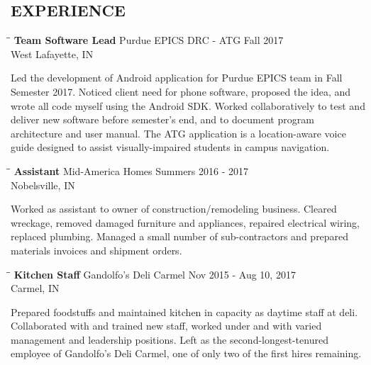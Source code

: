 \documentclass[10pt]{res}
\begin{document}
\begin{resume}
\section{EXPERIENCE}
   \vspace{-0.1in}	
	\begin{tabbing}
   \hspace{2.3in}\= \hspace{2.6in}\= \kill %
    {\bf Team Software Lead} \>Purdue EPICS DRC - ATG \>Fall 2017 \\
                             \>West Lafayette, IN
   \end{tabbing}\vspace{-20pt}      %
	Led the development of Android application for Purdue EPICS team in Fall Semester 2017. Noticed client need for phone software, proposed the idea, and wrote all code myself
	using the Android SDK. Worked collaboratively to test and deliver new software before semester's end, and to document program architecture and user manual. The ATG
	application is a location-aware voice guide designed to assist visually-impaired students in campus navigation.
	\begin{tabbing}
   \hspace{2.3in}\= \hspace{2.6in}\= \kill %
    {\bf Assistant} \>Mid-America Homes \>Summers 2016 - 2017 \\
                             \>Nobelsville, IN
   \end{tabbing}\vspace{-20pt}      %
	Worked as assistant to owner of construction/remodeling business. 
	Cleared wreckage, removed damaged furniture and appliances, repaired electrical wiring, replaced plumbing. 
	Managed a small number of sub-contractors and prepared materials invoices and shipment orders. 
   \begin{tabbing}
   \hspace{2.3in}\= \hspace{2.6in}\= \kill %
    {\bf Kitchen Staff} \>Gandolfo's Deli Carmel \>Nov 2015 - Aug 10, 2017 \\
                          \>Carmel, IN
   \end{tabbing}\vspace{-20pt}
	Prepared foodstuffs and maintained kitchen in capacity as daytime staff at deli. 
	Collaborated with and trained new staff, worked under and with varied management and leadership positions. 
	Left as the second-longest-tenured employee of Gandolfo’s Deli Carmel, one of only two of the first hires remaining.
	

\end{resume}
\end{document}
